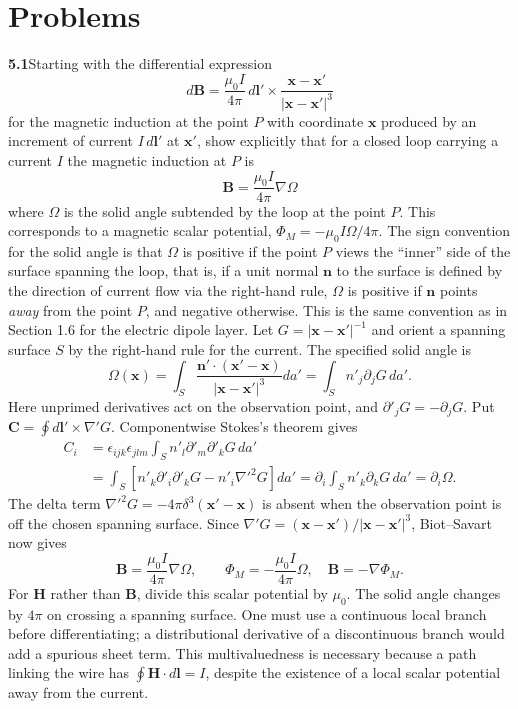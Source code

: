
\section*{Problems}

\par\bigskip
\noindent\textbf{5.1}\quad Starting with the differential expression
\[
d\mathbf{B}=\frac{\mu_{0}I}{4\pi}\,d\mathbf{l}'\times\frac{\mathbf{x}-\mathbf{x}'}{|\mathbf{x}-\mathbf{x}'|^{3}}
\]
for the magnetic induction at the point $P$ with coordinate $\mathbf{x}$ produced by an increment of current $I\,d\mathbf{l}'$ at $\mathbf{x}'$, show explicitly that for a closed loop carrying a current $I$ the magnetic induction at $P$ is
\[
\mathbf{B}=\frac{\mu_{0}I}{4\pi}\nabla\Omega
\]
where $\Omega$ is the solid angle subtended by the loop at the point $P$. This corresponds to a magnetic scalar potential, $\Phi_{M}=-\mu_{0}I\Omega/4\pi$. The sign convention for the solid angle is that $\Omega$ is positive if the point $P$ views the ``inner'' side of the surface spanning the loop, that is, if a unit normal $\mathbf{n}$ to the surface is defined by the direction of current flow via the right-hand rule, $\Omega$ is positive if $\mathbf{n}$ points \emph{away} from the point $P$, and negative otherwise. This is the same convention as in Section 1.6 for the electric dipole layer.
\solution
Let $G=|\mathbf x-\mathbf x'|^{-1}$ and orient a spanning surface $S$
by the right-hand rule for the current. The specified solid angle is
\[
\Omega(\mathbf x)=\int_S\frac{\mathbf n'\cdot(\mathbf x'-\mathbf x)}
{|\mathbf x-\mathbf x'|^3}da'
=\int_S n'_j\partial_jG\,da'.
\]
Here unprimed derivatives act on the observation point, and
$\partial'_jG=-\partial_jG$. Put
$\mathbf C=\oint d\mathbf l'\times\nabla'G$.
Componentwise Stokes's theorem gives
\[
\begin{split}
C_i&=\epsilon_{ijk}\epsilon_{jlm}
\int_S n'_l\partial'_m\partial'_kG\,da'\\
&=\int_S[n'_k\partial'_i\partial'_kG-n'_i\nabla'^2G]da'
=\partial_i\int_Sn'_k\partial_kG\,da'=\partial_i\Omega.
\end{split}
\]
The delta term $\nabla'^2G=-4\pi\delta^3(\mathbf x'-\mathbf x)$ is absent
when the observation point is off the chosen spanning surface.
Since $\nabla'G=(\mathbf x-\mathbf x')/|\mathbf x-\mathbf x'|^3$,
Biot--Savart now gives
\[
\boxed{\mathbf B=\frac{\mu_0I}{4\pi}\nabla\Omega,\qquad
\Phi_M=-\frac{\mu_0I}{4\pi}\Omega,\quad\mathbf B=-\nabla\Phi_M.}
\]
For $\mathbf H$ rather than $\mathbf B$, divide this scalar potential by
$\mu_0$. The solid angle changes by $4\pi$ on crossing a spanning surface.
One must use a continuous local branch before differentiating; a
distributional derivative of a discontinuous branch would add a spurious
sheet term. This multivaluedness is necessary because a path linking the
wire has $\oint\mathbf H\cdot d\mathbf l=I$, despite the existence of a
local scalar potential away from the current.


